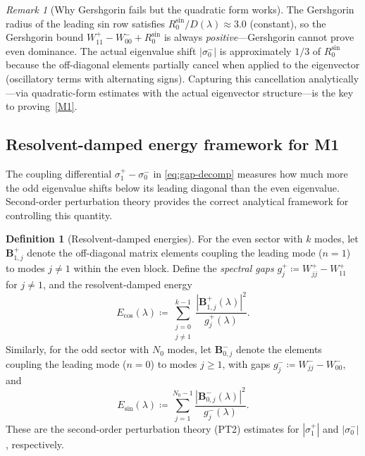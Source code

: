 \documentclass[12pt,a4paper]{article}
\theoremstyle{definition}
\newtheorem{definition}[theorem]{Definition}
\theoremstyle{remark}
\newtheorem{remark}[theorem]{Remark}
\begin{document}
\begin{remark}[Why Gershgorin fails but the quadratic form works]
The Gershgorin radius of the leading sin row satisfies $R_0^{\sin}/D(\lambda) \approx 3.0$ (constant), so the Gershgorin bound $W_{11}^+ - W_{00}^- + R_0^{\sin}$ is always \emph{positive}---Gershgorin cannot prove even dominance. The actual eigenvalue shift $|\sigma_0^-|$ is approximately $1/3$ of $R_0^{\sin}$ because the off-diagonal elements partially cancel when applied to the eigenvector (oscillatory terms with alternating signs). Capturing this cancellation analytically---via quadratic-form estimates with the actual eigenvector structure---is the key to proving~\ref{M1}.
\end{remark}


\subsection{Resolvent-damped energy framework for M1}
\label{sec:resolvent-M1}

The coupling differential $\sigma_1^+ - \sigma_0^-$ in \eqref{eq:gap-decomp} measures how much more the odd eigenvalue shifts below its leading diagonal than the even eigenvalue. Second-order perturbation theory provides the correct analytical framework for controlling this quantity.

\begin{definition}[Resolvent-damped energies]
\label{def:resolvent-energies}
For the even sector with $k$ modes, let $\mathbf{B}^+_{1,j}$ denote the off-diagonal matrix elements coupling the leading mode ($n=1$) to modes $j \neq 1$ within the even block. Define the \emph{spectral gaps} $g_j^+ \coloneqq W_{jj}^+ - W_{11}^+$ for $j \neq 1$, and the resolvent-damped energy
\[
  E_{\cos}(\lambda) \coloneqq \sum_{\substack{j=0 \\ j \neq 1}}^{k-1} \frac{|\mathbf{B}^+_{1,j}(\lambda)|^2}{g_j^+(\lambda)}.
\]
Similarly, for the odd sector with $N_0$ modes, let $\mathbf{B}^-_{0,j}$ denote the elements coupling the leading mode ($n=0$) to modes $j \geq 1$, with gaps $g_j^- \coloneqq W_{jj}^- - W_{00}^-$, and
\[
  E_{\sin}(\lambda) \coloneqq \sum_{j=1}^{N_0-1} \frac{|\mathbf{B}^-_{0,j}(\lambda)|^2}{g_j^-(\lambda)}.
\]
These are the second-order perturbation theory (PT2) estimates for $|\sigma_1^+|$ and $|\sigma_0^-|$, respectively.
\end{definition}
\end{document}
